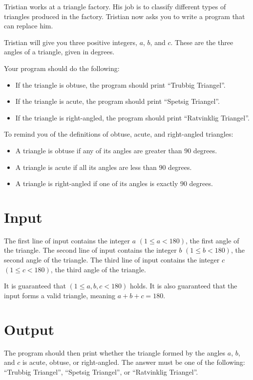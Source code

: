 
\noindent
Tristian works at a triangle factory.  
His job is to classify different types of triangles produced in the factory.  
Tristian now asks you to write a program that can replace him.

Tristian will give you three positive integers, $a$, $b$, and $c$.
These are the three angles of a triangle, given in degrees.

Your program should do the following:  
\begin{itemize}
  \item If the triangle is obtuse, the program should print ``Trubbig Triangel''.
  \item If the triangle is acute, the program should print ``Spetsig Triangel''.
  \item If the triangle is right-angled, the program should print ``Ratvinklig Triangel''.
\end{itemize}  

To remind you of the definitions of obtuse, acute, and right-angled triangles:  
\begin{itemize}
  \item A triangle is obtuse if any of its angles are greater than $90$ degrees.  
  \item A triangle is acute if all its angles are less than $90$ degrees.  
  \item A triangle is right-angled if one of its angles is exactly $90$ degrees.  
\end{itemize}  

\section*{Input}
The first line of input contains the integer $a$ $(1 \leq a < 180)$, the first angle of the triangle.
The second line of input contains the integer $b$ $(1 \leq b < 180)$, the second angle of the triangle.
The third line of input contains the integer $c$ $(1 \leq c < 180)$, the third angle of the triangle.

It is guaranteed that $(1 \leq a, b, c < 180)$ holds. 
It is also guaranteed that the input forms a valid triangle, meaning $a + b + c = 180$.  


\section*{Output}
The program should then print whether the triangle formed by the angles $a$, $b$, and $c$ is acute, obtuse, or right-angled.
The answer must be one of the following: ``Trubbig Triangel'',
``Spetsig Triangel'', or ``Ratvinklig Triangel''.  



